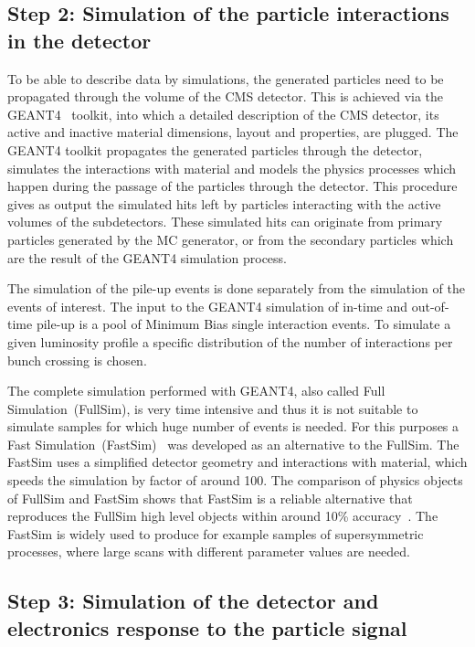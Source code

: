 \subsection{Step 2: Simulation of the particle interactions in the detector}

To be able to describe data by simulations, the generated particles need to be propagated through the volume of the CMS detector. This is achieved via the GEANT4~\cite{Agostinelli:2002hh, Lefebure:1999wja} toolkit, into which a detailed description of the CMS detector, its active and inactive material dimensions, layout and properties, are plugged. The GEANT4 toolkit propagates the generated particles through the detector, simulates the interactions with material and models the physics processes which happen during the passage of the particles through the detector. This procedure gives as output the simulated hits left by particles interacting with the active volumes of the subdetectors. These simulated hits can originate from primary particles generated by the MC generator, or from the secondary particles which are the result of the GEANT4 simulation process.

The simulation of the pile-up events is done separately from the simulation of the events of interest. The input to the GEANT4 simulation of in-time and out-of-time pile-up is a pool of Minimum Bias single interaction events. To simulate a given luminosity profile a specific distribution of the number of interactions per bunch crossing is chosen. 


The complete simulation performed with GEANT4, also called Full Simulation~(FullSim), is very time intensive and thus it is not suitable to simulate samples for which huge number of events is needed. For this purposes a Fast Simulation~(FastSim)~\cite{Sekmen:2017hzs, CMS:2010spa, Giammanco:2014bza} was developed as an alternative to the FullSim. The FastSim uses a simplified detector geometry and interactions with material, which speeds the simulation by factor of around 100. The comparison of physics objects of FullSim and FastSim shows that FastSim is a reliable alternative that reproduces the FullSim high level objects within around 10\% accuracy~\cite{Sekmen:2017hzs, Abdullin:2011zz}. The FastSim is widely used to produce for example samples of supersymmetric processes, where large scans with different parameter values are needed.

\subsection{Step 3: Simulation of the detector and electronics response to the particle signal}

